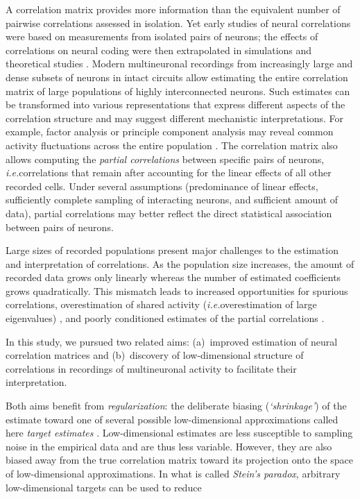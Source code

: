 \documentclass[10pt]{article}
\begin{document}
A correlation matrix provides more information than the equivalent number of pairwise correlations assessed in isolation.  Yet early studies of neural correlations were based on measurements from isolated pairs of neurons; the effects of correlations on neural coding were then extrapolated in simulations and theoretical studies \cite{Shadlen:1998,Zohary:1994}.  Modern multineuronal recordings from increasingly large and dense subsets of neurons in intact circuits allow estimating the entire correlation matrix of large populations of highly interconnected neurons.  Such estimates can be transformed into various representations that express different aspects of the correlation structure and may suggest different mechanistic interpretations.  For example, factor analysis or principle component analysis may reveal common activity fluctuations across the entire population \cite{Yu:2009}.  The correlation matrix also allows computing the \emph{partial correlations} between specific pairs of neurons, \emph{i.e.}\;correlations that remain after accounting for the linear effects of all other recorded cells.  Under several assumptions (predominance of linear effects, sufficiently complete sampling of interacting neurons, and sufficient amount of data), partial correlations may better reflect the direct statistical association between pairs of neurons.

Large sizes of recorded populations present major challenges to the estimation and interpretation of correlations.  As the population size increases, the amount of recorded data grows only linearly whereas the number of estimated coefficients grows quadratically.  This mismatch leads to increased opportunities for spurious correlations, overestimation of shared activity (\emph{i.e.}\;overestimation of large eigenvalues) \cite{Ledoit:2004}, and poorly conditioned estimates of the partial correlations \cite{Schafer:2005}.

In this study, we pursued two related aims: (a)~improved estimation of neural correlation matrices and (b)~discovery of low-dimensional structure of correlations in recordings of multineuronal activity to facilitate their interpretation.

Both aims benefit from \emph{regularization}: the deliberate biasing (\emph{`shrinkage'}) of the estimate toward one of several possible low-dimensional approximations called here \emph{target estimates} \cite{Schafer:2005,Bickel:2006}. Low-dimensional estimates are less susceptible to sampling noise in the empirical data and are thus less variable.  However, they are also biased away from the true correlation matrix toward its projection onto the space of low-dimensional approximations. In what is called \emph{Stein's paradox}, arbitrary low-dimensional targets can be used to reduce 
\end{document}
